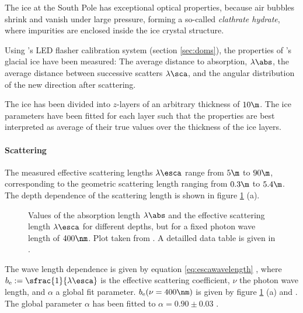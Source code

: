 The ice at the South Pole has exceptional optical properties, because air bubbles shrink and vanish under large pressure, forming a so-called \textit{clathrate hydrate}, where impurities are enclosed inside the ice crystal structure. \cite{rongenswedishcamera}

Using \icecube's LED flasher calibration system (section \ref{sec:doms}), the properties of \icecube's glacial ice have been measured: The average distance to absorption, $\lambda\abs$, the average distance between successive scatters $\lambda\sca$, and the angular distribution of the new direction after scattering. \cite{icepaper}

The ice has been divided into $z$-layers of an arbitrary thickness of $10\m$. The ice parameters have been fitted for each layer such that the properties are best interpreted as average of their true values over the thickness of the ice layers. \cite{icepaper}


\paragraph{Scattering}
The measured effective scattering lengths $\lambda\esca$ range from $5\m$ to $90\m$, corresponding to the geometric scattering length ranging from $0.3\m$ to $5.4\m$. The depth dependence of the scattering length is shown in figure \ref{fig:Ahxobai3} (a). \cite{icepaper}

\begin{figure}[htbp]
  \hfill
  \caption{Values of the absorption length $\lambda\abs$ and the effective scattering length $\lambda\esca$ for different depths, but for a fixed photon wave length of $400\nm$. Plot taken from \cite[figure 16]{icepaper}. A detailled data table is given in \cite[table C1]{icepaper}.}
  \label{fig:Ahxobai3}
\end{figure}


The wave length dependence is given by equation \ref{eq:escawavelength} \cite[section 4]{icepaper}, where $b_\text{e} := \sfrac{1}{\lambda\esca}$ is the effective scattering coefficient, $\nu$ the photon wave length, and $\alpha$ a global fit parameter. $b_\text{e}(\nu = 400\nm)$ is given by figure \ref{fig:Ahxobai3} (a) and \cite[table C4]{icepaper}. The global parameter $\alpha$ has been fitted to $\alpha = 0.90 \pm 0.03$ \cite[section 5.1]{ackermann}.

